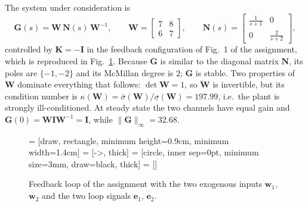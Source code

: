 The system under consideration is
\begin{equation}
    \mathbf{G}(s) = \mathbf{W}\,\mathbf{N}(s)\,\mathbf{W}^{-1},\qquad
    \mathbf{W}=\begin{bmatrix}7&8\\6&7\end{bmatrix},\qquad
    \mathbf{N}(s)=\begin{bmatrix}\frac{1}{s+1}&0\\0&\frac{2}{s+2}\end{bmatrix},
    \label{eq:G213}
\end{equation}
controlled by $\mathbf{K}=-\mathbf{I}$ in the feedback configuration of Fig.~1 of the
assignment, which is reproduced in Fig.~\ref{fig:loop213}. Because $\mathbf{G}$ is similar to the
diagonal matrix $\mathbf{N}$, its poles are $\{-1,-2\}$ and its McMillan degree is $2$;
$\mathbf{G}$ is stable. Two properties of $\mathbf{W}$ dominate everything that follows:
$\det\mathbf{W}=1$, so $\mathbf{W}$ is invertible, but its condition number is
$\kappa(\mathbf{W})=\bar{\sigma}(\mathbf{W})/\underline{\sigma}(\mathbf{W})=197.99$, i.e.\ the
plant is strongly ill-conditioned. At steady state the two channels have equal gain and
$\mathbf{G}(0)=\mathbf{W}\mathbf{I}\mathbf{W}^{-1}=\mathbf{I}$, while
$\|\mathbf{G}\|_\infty = 32.68$.

\begin{figure}[htb]
  \centering
       = [draw, rectangle, minimum height=0.9cm, minimum width=1.4cm]
   = [->, thick]
         = [circle, inner sep=0pt, minimum size=3mm, draw=black, thick]
       = []
  \caption{Feedback loop of the assignment with the two exogenous inputs $\mathbf{w}_1$,
           $\mathbf{w}_2$ and the two loop signals $\mathbf{e}_1$, $\mathbf{e}_2$.}
  \label{fig:loop213}
\end{figure}

